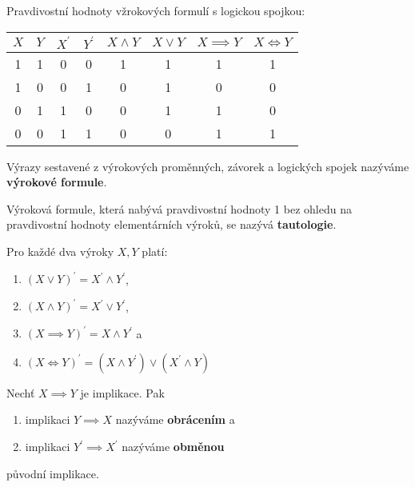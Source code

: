 \begin{pozn}
  Pravdivostní hodnoty vžrokových formulí s logickou spojkou:
  \begin{center}
    \begin{tabular}{c c | c c | c c c c}
      $X$ & $Y$ & $X^\prime$ & $Y^\prime$ & $X\land Y$ & $X\lor Y$ & $X\implies Y$ & $X\iff Y$ \\
      \hline
      1 & 1 & 0 & 0 & 1 & 1 & 1 & 1 \\
      1 & 0 & 0 & 1 & 0 & 1 & 0 & 0 \\
      0 & 1 & 1 & 0 & 0 & 1 & 1 & 0 \\
      0 & 0 & 1 & 1 & 0 & 0 & 1 & 1 \\
    \end{tabular}
  \end{center}
\end{pozn}

\begin{definition}
  Výrazy sestavené z výrokových proměnných, závorek a logických spojek nazýváme \textbf{výrokové formule}.
\end{definition}

\begin{definition}
  Výroková formule, která nabývá pravdivostní hodnoty 1 bez ohledu na pravdivostní hodnoty elementárních výroků, se nazývá \textbf{tautologie}.
\end{definition}

\begin{veta}
  Pro každé dva výroky $X,Y$ platí:
  \begin{enumerate}[$i.$]
    \item $(X\lor Y)^\prime = X^\prime \land Y^\prime$,
    \item $(X\land Y)^\prime = X^\prime \lor Y^\prime$,
    \item $(X\implies Y)^\prime = X\land Y^\prime$ a
    \item $(X\iff Y)^\prime = (X\land Y^\prime) \lor (X^\prime \land Y)$
  \end{enumerate}
\end{veta}

\begin{definition}
  Nechť $X\implies Y$ je implikace. Pak
  \begin{enumerate}[$i.$]
    \item implikaci $Y\implies X$ nazýváme \textbf{obrácením} a
    \item implikaci $Y^\prime \implies X^\prime$ nazýváme \textbf{obměnou}
  \end{enumerate}
  původní implikace.
\end{definition}

